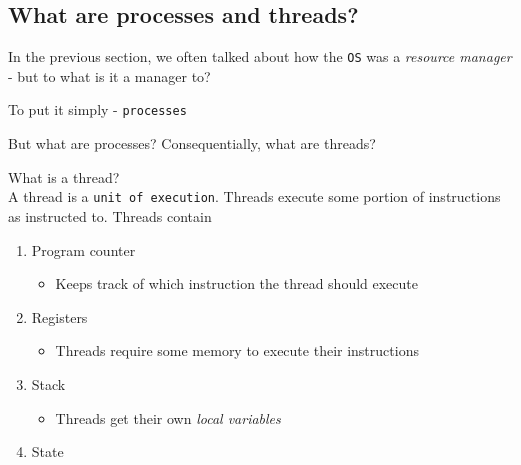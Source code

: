 \documentclass[journal, letterpaper]{IEEEtran}
\begin{document}
\subsection{What are processes and threads?}
In the previous section, we often talked about how the \verb|OS| was a \textit{resource manager} - but 
to what is it a manager to?
\begin{center}
    To put it simply - \verb|processes|
\end{center}

But what are processes? Consequentially, what are threads?
\begin{theory}{What is a thread?} \\
    A thread is a \verb|unit of execution|. Threads execute some portion of instructions as instructed to. Threads contain
    \begin{enumerate}
        \item Program counter
        \begin{itemize}
            \item Keeps track of which instruction the thread should execute
        \end{itemize}
        \item Registers
        \begin{itemize}
            \item Threads require some memory to execute their instructions
        \end{itemize}
        \item Stack
        \begin{itemize}
            \item Threads get their own \textit{local variables}
        \end{itemize}
        \item State
    \end{enumerate}
\end{theory}
\end{document}
